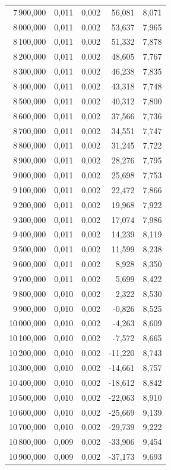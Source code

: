 \begin{longtable}{rrrrr}
7\,900,000 & 0,011 & 0,002 & 56,081 & 8,071\\
8\,000,000 & 0,011 & 0,002 & 53,637 & 7,965\\
8\,100,000 & 0,011 & 0,002 & 51,332 & 7,878\\
8\,200,000 & 0,011 & 0,002 & 48,605 & 7,767\\
8\,300,000 & 0,011 & 0,002 & 46,238 & 7,835\\
8\,400,000 & 0,011 & 0,002 & 43,318 & 7,748\\
8\,500,000 & 0,011 & 0,002 & 40,312 & 7,800\\
8\,600,000 & 0,011 & 0,002 & 37,566 & 7,736\\
8\,700,000 & 0,011 & 0,002 & 34,551 & 7,747\\
8\,800,000 & 0,011 & 0,002 & 31,245 & 7,722\\
8\,900,000 & 0,011 & 0,002 & 28,276 & 7,795\\
9\,000,000 & 0,011 & 0,002 & 25,698 & 7,753\\
9\,100,000 & 0,011 & 0,002 & 22,472 & 7,866\\
9\,200,000 & 0,011 & 0,002 & 19,968 & 7,922\\
9\,300,000 & 0,011 & 0,002 & 17,074 & 7,986\\
9\,400,000 & 0,011 & 0,002 & 14,239 & 8,119\\
9\,500,000 & 0,011 & 0,002 & 11,599 & 8,238\\
9\,600,000 & 0,011 & 0,002 & 8,928 & 8,350\\
9\,700,000 & 0,011 & 0,002 & 5,699 & 8,422\\
9\,800,000 & 0,010 & 0,002 & 2,322 & 8,530\\
9\,900,000 & 0,010 & 0,002 & -0,826 & 8,525\\
10\,000,000 & 0,010 & 0,002 & -4,263 & 8,609\\
10\,100,000 & 0,010 & 0,002 & -7,572 & 8,665\\
10\,200,000 & 0,010 & 0,002 & -11,220 & 8,743\\
10\,300,000 & 0,010 & 0,002 & -14,661 & 8,757\\
10\,400,000 & 0,010 & 0,002 & -18,612 & 8,842\\
10\,500,000 & 0,010 & 0,002 & -22,063 & 8,910\\
10\,600,000 & 0,010 & 0,002 & -25,669 & 9,139\\
10\,700,000 & 0,010 & 0,002 & -29,739 & 9,222\\
10\,800,000 & 0,009 & 0,002 & -33,906 & 9,454\\
10\,900,000 & 0,009 & 0,002 & -37,173 & 9,693\\

\end{longtable}
